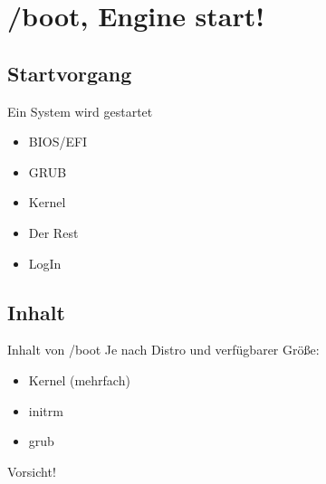 \section[/boot]{/boot, Engine start!}
\subsection{Startvorgang}
\begin{frame}{Ein System wird gestartet}
\begin{itemize}
 \item BIOS/EFI
 \item GRUB
 \item Kernel
 \item Der Rest
 \item LogIn
\end{itemize}

\end{frame}

\subsection{Inhalt}
\begin{frame}{Inhalt von /boot}
Je nach Distro und verfügbarer Größe:
\begin{itemize}
 \item Kernel (mehrfach)
 \item initrm
 \item grub
\end{itemize}
\begin{center}
{\large Vorsicht!}
 
\end{center}

\end{frame}